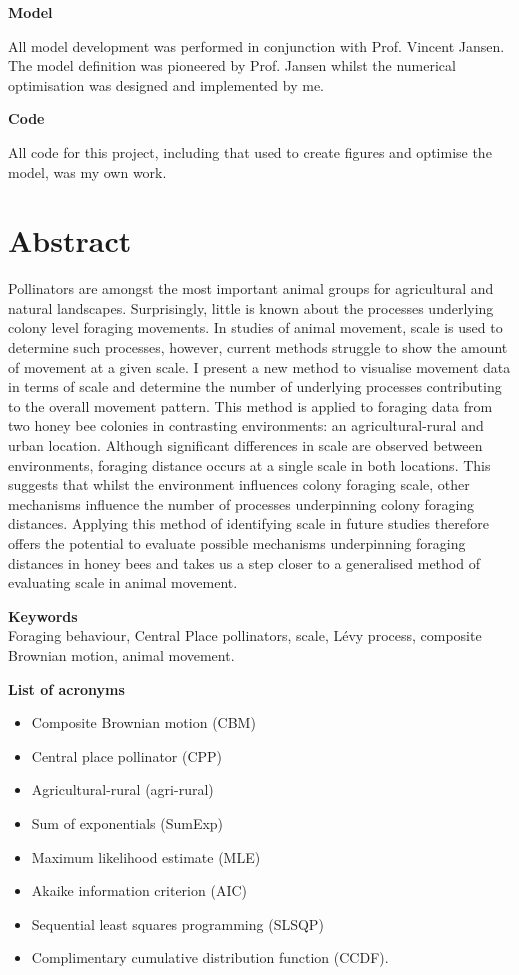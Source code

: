 \documentclass[11pt,usenames,dvipsnames,a4paper]{article}
\begin{document}
\noindent
\Large{\textbf{Model}}

\noindent
All model development was performed in conjunction with Prof. Vincent Jansen. The model definition was pioneered by Prof. Jansen whilst the numerical optimisation was designed and implemented by me.

\noindent
\Large{\textbf{Code}}

\noindent
All code for this project, including that used to create figures and optimise the model, was my own work.

\newpage
\tableofcontents
\newpage

\section{Abstract}

\begin{linenumbers}
Pollinators are amongst the most important animal groups for agricultural and natural landscapes. Surprisingly, little is known about the processes underlying colony level foraging movements. In studies of animal movement, scale is used to determine such processes, however, current methods struggle to show the amount of movement at a given scale. I present a new method to visualise movement data in terms of scale and determine the number of underlying processes contributing to the overall movement pattern. This method is applied to foraging data from two honey bee colonies in contrasting environments: an agricultural-rural and urban location. Although significant differences in scale are observed between environments, foraging distance occurs at a single scale in both locations. This suggests that whilst the environment influences colony foraging scale, other mechanisms influence the number of processes underpinning colony foraging distances. Applying this method of identifying scale in future studies therefore offers the potential to evaluate possible mechanisms underpinning foraging distances in honey bees and takes us a step closer to a generalised method of evaluating scale in animal movement.	
\end{linenumbers}

\noindent
\Large{\textbf{Keywords}}\\
\noindent
Foraging behaviour, Central Place pollinators, scale, L\'evy process, composite Brownian motion, animal movement.

\noindent
\Large{\textbf{List of acronyms}}\\
\noindent
\begin{itemize}
	\item Composite Brownian motion (CBM)
	\item Central place pollinator (CPP)
	\item Agricultural-rural (agri-rural)
	\item Sum of exponentials (SumExp)
	\item Maximum likelihood estimate (MLE)
	\item Akaike information criterion (AIC)
	\item Sequential least squares programming (SLSQP)
	\item Complimentary cumulative distribution function (CCDF).
\end{itemize}
\end{document}
